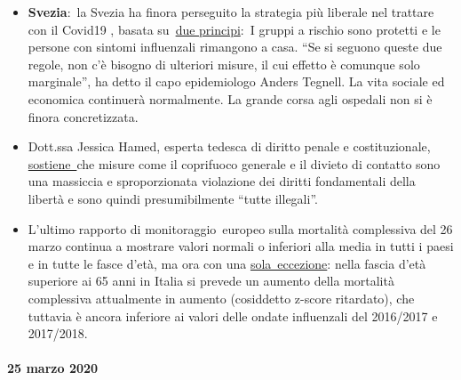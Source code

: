\begin{itemize}
\tightlist
\item
  \textbf{Svezia}:~la Svezia ha finora perseguito la strategia più
  liberale nel trattare con il Covid19 , basata
  su~\href{https://www.zeit.de/politik/ausland/2020-03/coronavirus-schweden-stockholm-oeffentliches-leben/komplettansicht}{due
  principi}:~I gruppi a rischio sono protetti e le persone con sintomi
  influenzali rimangono a casa. ``Se si seguono queste due regole, non
  c'è bisogno di ulteriori misure, il cui effetto è comunque solo
  marginale'', ha detto il capo epidemiologo Anders Tegnell. La vita
  sociale ed economica continuerà normalmente. La grande corsa agli
  ospedali non si è finora concretizzata.
\item
  Dott.ssa Jessica Hamed, esperta tedesca di diritto penale e
  costituzionale,
  \href{https://www.fr.de/politik/coronakrise-deutschland-sind-kontaktsperren-ausgangsbeschraenkungen-rechtswidrig-13611821.html}{sostiene~}che
  misure come il coprifuoco generale e il divieto di contatto sono una
  massiccia e sproporzionata violazione dei diritti fondamentali della
  libertà e sono quindi presumibilmente ``tutte illegali''.
\item
  L'ultimo rapporto di monitoraggio~europeo sulla mortalità complessiva
  del 26 marzo continua a mostrare valori normali o inferiori alla media
  in tutti i paesi e in tutte le fasce d'età, ma ora con una
  \href{https://www.euromomo.eu/outputs/zscore_country65.html}{sola~eccezione}:
  nella fascia d'età superiore ai 65 anni in Italia si prevede un
  aumento della mortalità complessiva attualmente in aumento (cosiddetto
  z-score ritardato), che tuttavia è ancora inferiore ai valori delle
  ondate influenzali del 2016/2017 e 2017/2018.
\end{itemize}

\hypertarget{25-marzo-2020}{%
\paragraph{25 marzo 2020}\label{25-marzo-2020}}

